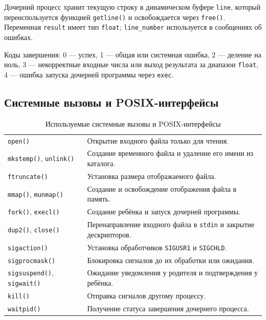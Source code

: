 \documentclass[12pt, a4paper]{article}
\begin{document}
Дочерний процесс хранит текущую строку в динамическом буфере \texttt{line}, который переиспользуется функцией \texttt{getline()} и освобождается через \texttt{free()}. Переменная \texttt{result} имеет тип \texttt{float}; \texttt{line\_number} используется в сообщениях об ошибках.

Коды завершения: 0 --- успех, 1 --- общая или системная ошибка, 2 --- деление на ноль, 3 --- некорректные входные числа или выход результата за диапазон \texttt{float}, 4 --- ошибка запуска дочерней программы через \texttt{exec}.

\subsection{Системные вызовы и POSIX-интерфейсы}

\begin{table}[H]
  \caption{Используемые системные вызовы и POSIX-интерфейсы}
  \begin{tabularx}{\linewidth}{|P{5.2cm}|L|}
    \hline
     &  \\ \hline
    \texttt{open()} & Открытие входного файла только для чтения. \\ \hline
    \texttt{mkstemp()}, \texttt{unlink()} & Создание временного файла и удаление его имени из каталога. \\ \hline
    \texttt{ftruncate()} & Установка размера отображаемого файла. \\ \hline
    \texttt{mmap()}, \texttt{munmap()} & Создание и освобождение отображения файла в память. \\ \hline
    \texttt{fork()}, \texttt{execl()} & Создание ребёнка и запуск дочерней программы. \\ \hline
    \texttt{dup2()}, \texttt{close()} & Перенаправление входного файла в \texttt{stdin} и закрытие дескрипторов. \\ \hline
    \texttt{sigaction()} & Установка обработчиков \texttt{SIGUSR1} и \texttt{SIGCHLD}. \\ \hline
    \texttt{sigprocmask()} & Блокировка сигналов до их обработки или ожидания. \\ \hline
    \texttt{sigsuspend()}, \texttt{sigwait()} & Ожидание уведомления у родителя и подтверждения у ребёнка. \\ \hline
    \texttt{kill()} & Отправка сигналов другому процессу. \\ \hline
    \texttt{waitpid()} & Получение статуса завершения дочернего процесса. \\ \hline
  \end{tabularx}
\end{table}
\end{document}

